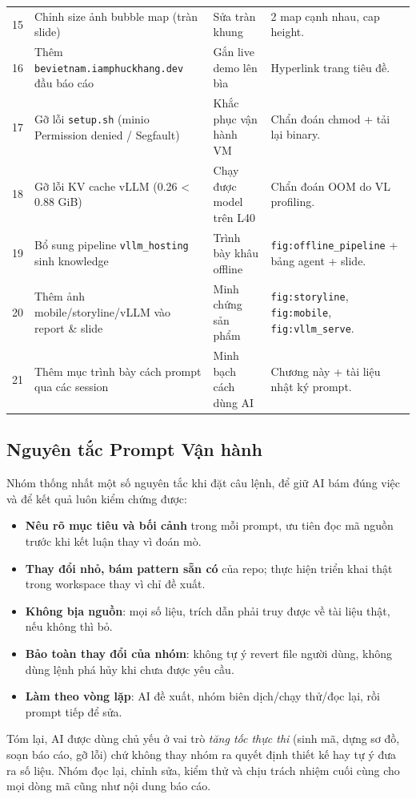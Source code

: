 \begin{table}[H]
\begin{tabularx}{\textwidth}{@{}p{0.4cm} >{\raggedright\arraybackslash}p{4.2cm} >{\raggedright\arraybackslash}p{3.3cm} X@{}}
15 & Chỉnh size ảnh bubble map (tràn slide) & Sửa tràn khung & 2 map cạnh nhau, cap height. \\
16 & Thêm \texttt{bevietnam.iamphuckhang.dev} đầu báo cáo & Gắn live demo lên bìa & Hyperlink trang tiêu đề. \\
17 & Gỡ lỗi \texttt{setup.sh} (minio Permission denied / Segfault) & Khắc phục vận hành VM & Chẩn đoán chmod + tải lại binary. \\
18 & Gỡ lỗi KV cache vLLM (0.26 < 0.88 GiB) & Chạy được model trên L40 & Chẩn đoán OOM do VL profiling. \\
19 & Bổ sung pipeline \texttt{vllm\_hosting} sinh knowledge & Trình bày khâu offline & \texttt{fig:offline\_pipeline} + bảng agent + slide. \\
20 & Thêm ảnh mobile/storyline/vLLM vào report \& slide & Minh chứng sản phẩm & \texttt{fig:storyline}, \texttt{fig:mobile}, \texttt{fig:vllm\_serve}. \\
21 & Thêm mục trình bày cách prompt qua các session & Minh bạch cách dùng AI & Chương này + tài liệu nhật ký prompt. \\
\bottomrule
\end{tabularx}
\end{table}

\subsection{Nguyên tắc Prompt Vận hành}
\contrib

Nhóm thống nhất một số nguyên tắc khi đặt câu lệnh, để giữ AI bám đúng
việc và để kết quả luôn kiểm chứng được:

\begin{itemize}
  \item \textbf{Nêu rõ mục tiêu và bối cảnh} trong mỗi prompt, ưu tiên đọc
  mã nguồn trước khi kết luận thay vì đoán mò.
  \item \textbf{Thay đổi nhỏ, bám pattern sẵn có} của repo; thực hiện
  triển khai thật trong workspace thay vì chỉ đề xuất.
  \item \textbf{Không bịa nguồn}: mọi số liệu, trích dẫn phải truy được về
  tài liệu thật, nếu không thì bỏ.
  \item \textbf{Bảo toàn thay đổi của nhóm}: không tự ý revert file người
  dùng, không dùng lệnh phá hủy khi chưa được yêu cầu.
  \item \textbf{Làm theo vòng lặp}: AI đề xuất, nhóm biên dịch/chạy
  thử/đọc lại, rồi prompt tiếp để sửa.
\end{itemize}

Tóm lại, AI được dùng chủ yếu ở vai trò \textit{tăng tốc thực thi} (sinh
mã, dựng sơ đồ, soạn báo cáo, gỡ lỗi) chứ không thay nhóm ra quyết định
thiết kế hay tự ý đưa ra số liệu. Nhóm đọc lại, chỉnh sửa, kiểm thử và
chịu trách nhiệm cuối cùng cho mọi dòng mã cũng như nội dung báo cáo.
